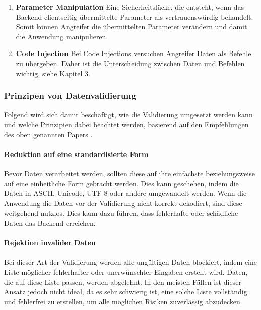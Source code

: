 \begin{enumerate}

    \item \textbf{Parameter Manipulation} Eine Sicherheitslücke, die entsteht, wenn das Backend clientseitig übermittelte Parameter als vertrauenswürdig behandelt. Somit können Angreifer die übermittelten Parameter verändern und damit die Anwendung manipulieren. \cite{prompt7_pollak}
    
    \item \textbf{Code Injection} Bei Code Injections versuchen Angreifer Daten als Befehle zu übergeben. Daher ist die Unterscheidung zwischen Daten und Befehlen wichtig, siehe Kapitel 3\cite{DeVries2006}. \cite{prompt8_pollak} \cite{prompt9_pollak}
    
\end{enumerate}

\subsubsection{Prinzipen von Datenvalidierung}
Folgend wird sich damit beschäftigt, wie die Validierung umgesetzt werden kann und welche Prinzipien dabei beachtet werden, basierend auf den Empfehlungen des oben genannten Papers \cite{DeVries2006}.
    
\paragraph{Reduktion auf eine standardisierte Form}
Bevor Daten verarbeitet werden, sollten diese auf ihre einfachste beziehungsweise auf eine einheitliche Form gebracht werden. Dies kann geschehen, indem die Daten in ASCII, Unicode, UTF-8 oder andere umgewandelt werden. Wenn die Anwendung die Daten vor der Validierung nicht korrekt dekodiert, sind diese weitgehend nutzlos. Dies kann dazu führen, dass fehlerhafte oder schädliche Daten das Backend erreichen.
 
\paragraph{Rejektion invalider Daten}
Bei dieser Art der Validierung werden alle ungültigen Daten blockiert, indem eine Liste möglicher fehlerhafter oder unerwünschter Eingaben erstellt wird. Daten, die auf diese Liste passen, werden abgelehnt. In den meisten Fällen ist dieser Ansatz jedoch nicht ideal, da es sehr schwierig ist, eine solche Liste vollständig und fehlerfrei zu erstellen, um alle möglichen Risiken zuverlässig abzudecken.

